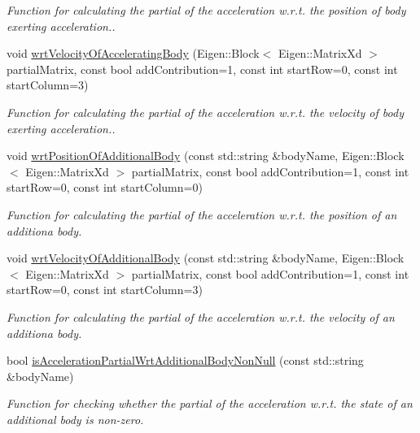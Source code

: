 \begin{DoxyCompactItemize}
\begin{DoxyCompactList}\small\item\em Function for calculating the partial of the acceleration w.\+r.\+t. the position of body exerting acceleration.. \end{DoxyCompactList}\item 
void \hyperlink{classtudat_1_1acceleration__partials_1_1ThirdBodyGravityPartial_ad933d6220bef70a8ec12d7196903ed27}{wrt\+Velocity\+Of\+Accelerating\+Body} (Eigen\+::\+Block$<$ Eigen\+::\+Matrix\+Xd $>$ partial\+Matrix, const bool add\+Contribution=1, const int start\+Row=0, const int start\+Column=3)
\begin{DoxyCompactList}\small\item\em Function for calculating the partial of the acceleration w.\+r.\+t. the velocity of body exerting acceleration.. \end{DoxyCompactList}\item 
void \hyperlink{classtudat_1_1acceleration__partials_1_1ThirdBodyGravityPartial_aa5f364604521f6aba10598bf6f46d9de}{wrt\+Position\+Of\+Additional\+Body} (const std\+::string \&body\+Name, Eigen\+::\+Block$<$ Eigen\+::\+Matrix\+Xd $>$ partial\+Matrix, const bool add\+Contribution=1, const int start\+Row=0, const int start\+Column=0)
\begin{DoxyCompactList}\small\item\em Function for calculating the partial of the acceleration w.\+r.\+t. the position of an additiona body. \end{DoxyCompactList}\item 
void \hyperlink{classtudat_1_1acceleration__partials_1_1ThirdBodyGravityPartial_a2a9b80a85c9a78946b4a021189956fd2}{wrt\+Velocity\+Of\+Additional\+Body} (const std\+::string \&body\+Name, Eigen\+::\+Block$<$ Eigen\+::\+Matrix\+Xd $>$ partial\+Matrix, const bool add\+Contribution=1, const int start\+Row=0, const int start\+Column=3)
\begin{DoxyCompactList}\small\item\em Function for calculating the partial of the acceleration w.\+r.\+t. the velocity of an additiona body. \end{DoxyCompactList}\item 
bool \hyperlink{classtudat_1_1acceleration__partials_1_1ThirdBodyGravityPartial_ac3f7c8583585747b6ef086d860772c49}{is\+Acceleration\+Partial\+Wrt\+Additional\+Body\+Non\+Null} (const std\+::string \&body\+Name)
\begin{DoxyCompactList}\small\item\em Function for checking whether the partial of the acceleration w.\+r.\+t. the state of an additional body is non-\/zero. \end{DoxyCompactList}\item 

\end{DoxyCompactItemize}
